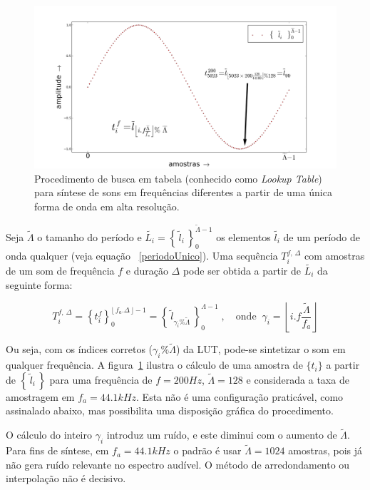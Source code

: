 \begin{figure}[h!]
    \centering
        \includegraphics[width=\textwidth]{figuras/lut}
    \caption{Procedimento de busca em tabela (conhecido como \emph{Lookup Table}) para síntese de sons em frequências diferentes a partir de uma única forma de onda em alta resolução.}
        \label{fig:lut}
\end{figure}

Seja $\widetilde{\Lambda}$ o tamanho 
do período e $\widetilde{L_i} = \left\{\, \widetilde{l}_i \,\right\}_0^{\widetilde{\Lambda} -1}$ os elementos $\widetilde{l_i}$ de um
período de onda qualquer (veja equação ~\ref{periodoUnico}). Uma sequência
$T_i^{f,\,\Delta}$ com amostras de um som de frequência $f$ e duração $\Delta$
pode ser obtida a partir de $\widetilde{L_i}$ da seguinte forma:

\begin{equation}\label{eq:lut}
T_i^{f,\,\Delta}=\left\{t_i^f\right\}_0^{\lfloor \, f_a . \Delta \, \rfloor -1} = \left\{ \, \widetilde{l}_{\gamma_i \% \widetilde{\Lambda} }\, \right\}_{0}^{\Lambda-1}\; , \quad \text{onde} \;\; \gamma_i = \left \lfloor i . f \frac{ \widetilde{\Lambda}}{f_a} \right \rfloor  
\end{equation}

Ou seja, com os índices corretos ($\gamma_i\%\widetilde{\Lambda}$)
da LUT, pode-se sintetizar o som em qualquer frequência. 
A figura~\ref{fig:lut} ilustra
o cálculo de uma amostra de $\{t_i\}$ 
a partir de $\left\{\,\widetilde{l}_i\,\right\}$ para uma frequência
de $f=200Hz$, $\widetilde{\Lambda}=128$ e considerada a taxa de amostragem em $f_a=44.1kHz$.
Esta não é uma configuração praticável, como assinalado abaixo, mas possibilita uma
disposição gráfica do procedimento.


O cálculo do inteiro $\gamma_i$ introduz um ruído, 
e este diminui com o aumento de $\widetilde{\Lambda}$.
Para fins de síntese, em $f_a=44.1 kHz$
 o padrão é usar $\widetilde{\Lambda} = 1024$ amostras, pois já não gera ruído
 relevante no espectro audível. O método de arredondamento ou interpolação não é decisivo.\cite{Geiger}

